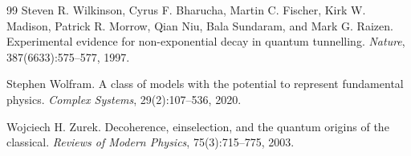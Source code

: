 \documentclass[11pt,a4paper]{article}
\theoremstyle{remark}\newtheorem{remark}[definition]{Remark}
\begin{document}
\begin{thebibliography}{99}
Steven R. Wilkinson, Cyrus F. Bharucha, Martin C. Fischer, Kirk W. Madison, Patrick R. Morrow,
Qian Niu, Bala Sundaram, and Mark G. Raizen.
\newblock Experimental evidence for non-exponential decay in quantum tunnelling.
\newblock \emph{Nature}, 387(6633):575--577, 1997.

Stephen Wolfram.
\newblock A class of models with the potential to represent fundamental physics.
\newblock \emph{Complex Systems}, 29(2):107--536, 2020.

Wojciech H. Zurek.
\newblock Decoherence, einselection, and the quantum origins of the classical.
\newblock \emph{Reviews of Modern Physics}, 75(3):715--775, 2003.

\end{thebibliography}
\end{document}
